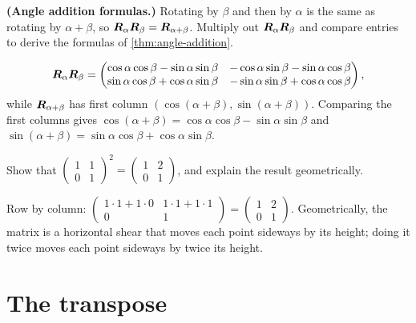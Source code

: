 \begin{exercise}
\textbf{(Angle addition formulas.)} Rotating by $\beta$ and then by $\alpha$ is
the same as rotating by $\alpha + \beta$, so $\bm{R}_\alpha\bm{R}_\beta =
\bm{R}_{\alpha + \beta}$. Multiply out $\bm{R}_\alpha\bm{R}_\beta$ and compare entries to
derive the formulas of \cref{thm:angle-addition}.
\end{exercise}
\begin{solution}
\[
  \bm{R}_\alpha\bm{R}_\beta =
  \begin{pmatrix} \cos\alpha\cos\beta - \sin\alpha\sin\beta &
    -\cos\alpha\sin\beta - \sin\alpha\cos\beta\\
    \sin\alpha\cos\beta + \cos\alpha\sin\beta &
    -\sin\alpha\sin\beta + \cos\alpha\cos\beta\end{pmatrix},
\]
while $\bm{R}_{\alpha+\beta}$ has first column
$(\cos(\alpha+\beta), \sin(\alpha+\beta))$. Comparing the first columns gives
$\cos(\alpha+\beta) = \cos\alpha\cos\beta - \sin\alpha\sin\beta$ and
$\sin(\alpha+\beta) = \sin\alpha\cos\beta + \cos\alpha\sin\beta$.
\end{solution}

\begin{exercise}
Show that $\left(\begin{smallmatrix} 1 & 1\\ 0 & 1\end{smallmatrix}\right)^2 =
\left(\begin{smallmatrix} 1 & 2\\ 0 & 1\end{smallmatrix}\right)$, and explain the
result geometrically.
\end{exercise}
\begin{solution}
Row by column: $\left(\begin{smallmatrix} 1\cdot1 + 1\cdot0 & 1\cdot1 +
1\cdot1\\ 0 & 1\end{smallmatrix}\right) = \left(\begin{smallmatrix} 1 & 2\\ 0 &
1\end{smallmatrix}\right)$. Geometrically, the matrix is a horizontal shear
that moves each point sideways by its height; doing it twice moves each point
sideways by twice its height.
\end{solution}

\section{The transpose}\label{sec:transpose}


